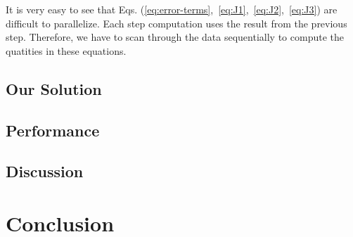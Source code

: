 \documentclass[english,12pt]{article}
\begin{document}
It is very easy to see that Eqs.
(\ref{eq:error-terms},~\ref{eq:J1},~\ref{eq:J2},~\ref{eq:J3}) are
difficult to parallelize. Each step computation uses the result from the
previous step. Therefore, we have to scan through the data sequentially to
compute the quatities in these equations.

\subsection{Our Solution}


\subsection{Performance}


\subsection{Discussion}


\section{Conclusion}




\end{document}
